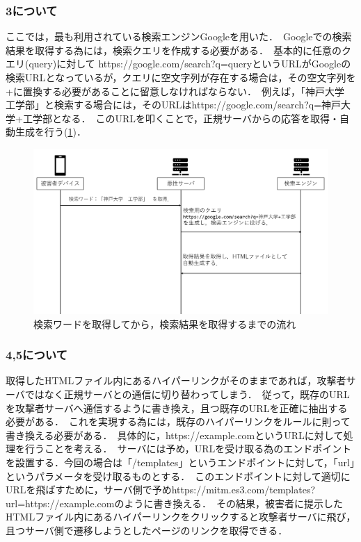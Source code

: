 \documentclass[dvipdfmx]{jsarticle}
\begin{document}
        \subsubsection{3について}
            ここでは，最も利用されている検索エンジンGoogleを用いた．\
            Googleでの検索結果を取得する為には，検索クエリを作成する必要がある．\
            基本的に任意のクエリ(query)に対して https://google.com/search?q=queryというURLがGoogleの検索URLとなっているが，クエリに空文字列が存在する場合は，その空文字列を+に置換する必要があることに留意しなければならない．\
            例えば，「神戸大学　工学部」と検索する場合には，そのURLはhttps://google.com/search?q=神戸大学+工学部となる．\
            このURLを叩くことで，正規サーバからの応答を取得・自動生成を行う(\ref{flow-no3})．\\
            \begin{figure}[pt]
                \centering
                \includegraphics[width=15cm]{img/vc-vf-3.png}
                \caption{検索ワードを取得してから，検索結果を取得するまでの流れ}
                \label{flow-no3} 
            \end{figure}
            \clearpage
        \subsubsection{4,5について}
            取得したHTMLファイル内にあるハイパーリンクがそのままであれば，攻撃者サーバではなく正規サーバとの通信に切り替わってしまう．\
            従って，既存のURLを攻撃者サーバへ通信するように書き換え，且つ既存のURLを正確に抽出する必要がある．\
            これを実現する為には，既存のハイパーリンクをルールに則って書き換える必要がある．\
            具体的に，https://example.comというURLに対して処理を行うことを考える．\
            サーバには予め，URLを受け取る為のエンドポイントを設置する．今回の場合は「/templates」というエンドポイントに対して，「url」というパラメータを受け取るものとする．\
            このエンドポイントに対して適切にURLを飛ばすために，サーバ側で予めhttps://mitm.es3.com/templates?url=https://example.comのように書き換える．\
            その結果，被害者に提示したHTMLファイル内にあるハイパーリンクをクリックすると攻撃者サーバに飛び，且つサーバ側で遷移しようとしたページのリンクを取得できる．
\end{document}
